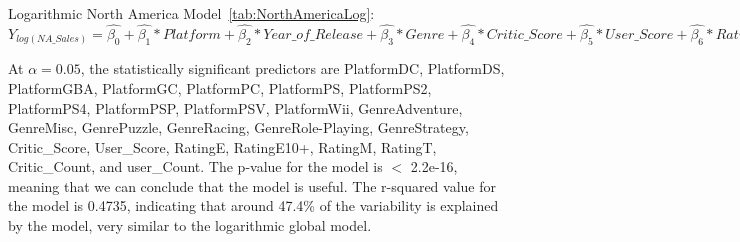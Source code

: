 \documentclass[12pt]{article}
\begin{document}
\begin{table}[ht]
\end{table}



Logarithmic North America Model~\ref{tab:NorthAmericaLog}:
$Y_{log(NA\_Sales)}=\hat{\beta_{0}}+\hat{\beta_{1}}*Platform+\hat{\beta_{2}}*Year\_of\_Release+\hat{\beta_{3}}*Genre+\hat{\beta_{4}}*Critic\_Score+\hat{\beta_{5}}*User\_Score+\hat{\beta_{6}}*Rating+\hat{\beta_{7}}*Critic\_Count+\hat{\beta_{8}}*Critic\_Count$

At $\alpha=0.05$, the statistically significant predictors are PlatformDC, PlatformDS, PlatformGBA, PlatformGC, PlatformPC, PlatformPS, 
PlatformPS2, PlatformPS4, PlatformPSP, PlatformPSV, PlatformWii, GenreAdventure, GenreMisc, GenrePuzzle, GenreRacing, GenreRole-Playing,
GenreStrategy, Critic\_Score, User\_Score, RatingE, RatingE10+, RatingM, RatingT, Critic\_Count, and user\_Count.  
The p-value for the model is $<$ 2.2e-16, meaning that we can conclude that the model is useful. The r-squared value for the model is 0.4735,
indicating that around 47.4\% of the variability is explained by the model, very similar to the logarithmic global model.
\end{document}
